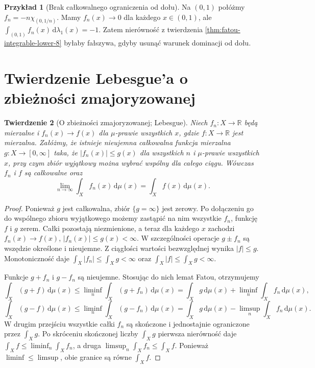 \documentclass[11pt,a4paper,oneside]{book}
\numberwithin{equation}{chapter}
\theoremstyle{plain}
\newtheorem{twierdzenie}{Twierdzenie}[chapter]
\theoremstyle{definition}
\newtheorem{przyklad}[twierdzenie]{Przykład}
\theoremstyle{remark}
\begin{document}
\begin{przyklad}[Brak całkowalnego ograniczenia od dołu]
Na $(0,1)$ połóżmy $f_n=-n\chi_{(0,1/n)}$.
Mamy $f_n(x)\to0$ dla każdego $x\in(0,1)$,
ale $\int_{(0,1)}f_n(x)\,\mathrm d\lambda_1(x)=-1$.
Zatem nierówność z twierdzenia
\ref{thm:fatou-integrable-lower-8} byłaby fałszywa,
gdyby usunąć warunek dominacji od dołu.
\end{przyklad}

\section{Twierdzenie Lebesgue'a o zbieżności zmajoryzowanej}

\begin{twierdzenie}[O zbieżności zmajoryzowanej; Lebesgue]
\label{thm:dct}
Niech $f_n:X\to\mathbb R$ będą mierzalne i
$f_n(x)\to f(x)$ dla $\mu$-prawie wszystkich $x$, gdzie
$f:X\to\mathbb R$ jest mierzalna. Załóżmy, że
istnieje nieujemna całkowalna funkcja mierzalna
$g:X\to[0,\infty]$ taka, że
$|f_n(x)|\le g(x)$ dla wszystkich $n$ i
$\mu$-prawie wszystkich $x$, przy czym zbiór
wyjątkowy można wybrać wspólny dla całego ciągu.
Wówczas $f_n$ i $f$ są całkowalne oraz
\begin{equation}\label{eq:dct}
\lim_{n\to\infty}\int_Xf_n(x)\,\mathrm d\mu(x)
=\int_Xf(x)\,\mathrm d\mu(x).
\end{equation}
\end{twierdzenie}
\begin{proof}
Ponieważ $g$ jest całkowalna, zbiór $\{g=\infty\}$
jest zerowy. Po dołączeniu go do wspólnego zbioru
wyjątkowego możemy zastąpić na nim wszystkie
$f_n$, funkcję $f$ i $g$ zerem. Całki pozostają
niezmienione, a teraz dla każdego $x$ zachodzi
$f_n(x)\to f(x)$, $|f_n(x)|\le g(x)<\infty$.
W szczególności operacje $g\pm f_n$ są wszędzie
określone i nieujemne.
Z ciągłości wartości bezwzględnej wynika $|f|\le g$.
Monotoniczność daje
$\int_X|f_n|\le\int_X g<\infty$ oraz
$\int_X|f|\le\int_X g<\infty$.

Funkcje $g+f_n$ i $g-f_n$ są nieujemne.
Stosując do nich lemat Fatou, otrzymujemy
\[
\int_X(g+f)\,\mathrm d\mu(x)
\le\liminf_n\int_X(g+f_n)\,\mathrm d\mu(x)
=\int_Xg\,\mathrm d\mu(x)+
\liminf_n\int_Xf_n\,\mathrm d\mu(x),
\]
\[
\int_X(g-f)\,\mathrm d\mu(x)
\le\liminf_n\int_X(g-f_n)\,\mathrm d\mu(x)
=\int_Xg\,\mathrm d\mu(x)-
\limsup_n\int_Xf_n\,\mathrm d\mu(x).
\]
W drugim przejściu wszystkie całki $f_n$ są
skończone i jednostajnie ograniczone przez $\int_X g$.
Po skróceniu skończonej liczby $\int_X g$ pierwsza
nierówność daje
$\int_X f\le\liminf_n\int_X f_n$, a druga
$\limsup_n\int_X f_n\le\int_X f$.
Ponieważ $\liminf\le\limsup$, obie granice
są równe $\int_X f$.
\end{proof}
\end{document}
